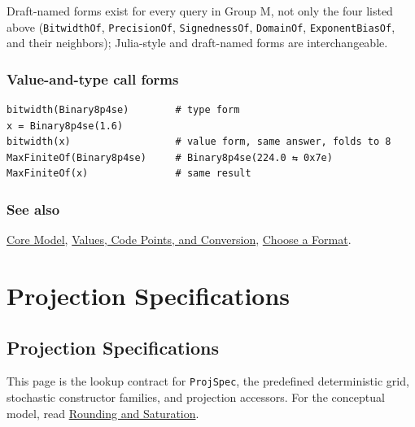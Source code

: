 Draft-named forms exist for every query in Group M, not only the four listed above (\texttt{BitwidthOf}, \texttt{PrecisionOf}, \texttt{SignednessOf}, \texttt{DomainOf}, \texttt{ExponentBiasOf}, and their neighbors); Julia-style and draft-named forms are interchangeable.



\subsection{Value-and-type call forms}



\label{7040199918633646645}{}



\begin{verbatim}
bitwidth(Binary8p4se)        # type form
x = Binary8p4se(1.6)
bitwidth(x)                  # value form, same answer, folds to 8
MaxFiniteOf(Binary8p4se)     # Binary8p4se(224.0 ⇆ 0x7e)
MaxFiniteOf(x)               # same result
\end{verbatim}



\subsection{See also}



\label{292862844209942199-dup10}{}


\href{core\_\allowbreak{}model.md}{Core Model}, \href{concept\_\allowbreak{}values\_\allowbreak{}codepoints.md}{Values, Code Points, and Conversion}, \href{workflow\_\allowbreak{}choose\_\allowbreak{}format.md}{Choose a Format}.



\chapter{Projection Specifications}


\section{Projection Specifications}



\label{6111242834475380465}{}


This page is the lookup contract for \texttt{ProjSpec}, the predefined deterministic grid, stochastic constructor families, and projection accessors. For the conceptual model, read \href{concept\_\allowbreak{}rounding\_\allowbreak{}saturation.md}{Rounding and Saturation}.



